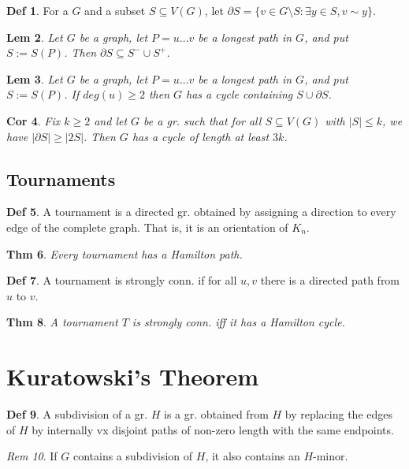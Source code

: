 \documentclass[11pt, fleqn, a4paper, landscape]{article}
\theoremstyle{plain} %
\newtheorem{thm}{Thm}
\newtheorem{lem}[thm]{Lem}
\newtheorem{cor}[thm]{Cor}
\theoremstyle{remark} %
\newtheorem{rem}[thm]{Rem}
\theoremstyle{definition} %
\newtheorem{defi}[thm]{Def}
\begin{document}
\begin{multicols}{5}
\begin{defi}
For a $G$ and a subset $S \subseteq V (G)$, let $\partial S = \{v \in G\setminus S : \exists y \in  S, v\sim y\}$.
\end{defi}

\begin{lem}
Let $G$ be a graph, let $P = u \dots v$ be a longest path in $G$, and put $S := S(P)$. Then $\partial S \subseteq S^- \cup  S^+$.
\end{lem}

\begin{lem}
Let $G$ be a graph, let $P = u \dots v$ be a longest path in $G$, and put $S := S(P)$. If $deg(u) \ge 2$ then $ G$ has a cycle containing $S \cup \partial S$.
\end{lem}

\begin{cor}
Fix $k \ge 2$ and let $G$ be a gr. such that for all $S \subseteq V (G)$ with $|S|\le k$, we have $|\partial S|\ge |2S|$. Then $G$ has a cycle of length at least $3k$.
\end{cor}

\subsection{Tournaments}
\begin{defi}
A tournament is a directed gr. obtained by assigning a direction to every
edge of the complete graph. That is, it is an orientation of $K_n$.
\end{defi}

\begin{thm}
Every tournament has a Hamilton path.
\end{thm}

\begin{defi}
A tournament is strongly conn. if for all $u, v$ there is a directed path from $u$ to $v$.
\end{defi}
\begin{thm}
A tournament $T$ is strongly conn. iff it has a Hamilton cycle.
\end{thm}

\section{Kuratowski’s Theorem}

\begin{defi}
A subdivision of a gr. $H$ is a gr. obtained from $H$ by replacing the edges of $H$ by internally vx disjoint paths of non-zero length with the same endpoints.
\end{defi}
\addtocounter{thm}{1}
\begin{rem}
If $G$ contains a subdivision of $H$, it also contains an $H$-minor.
\end{rem}


\end{multicols}
\end{document}

